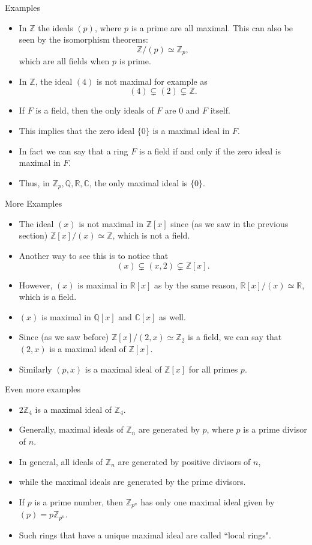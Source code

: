 \documentclass[ %
 10pt, xcolor={dvipsnames,svgnames,x11names,hyperref},
   hyperref={colorlinks=true,citecolor=green,linkcolor=DarkRed,urlcolor=ProcessBlue,anchorcolor=blue}
  ]{beamer}
\newenvironment{stepitemize}{\begin{itemize}[<+->]}{\end{itemize} }
\newcommand{\Z}{\mathbb{Z}}
\newcommand{\Q}{\mathbb{Q}}
\newcommand{\R}{\mathbb{R}}
\newcommand{\C}{\mathbb{C}}
\begin{document}
\begin{frame}{Examples}
\begin{stepitemize}
    \item In $\Z$ the ideals $(p)$, where $p$ is a prime are all maximal. This can also be seen by the isomorphism theorems:
    $$\Z/(p)\simeq \Z_p,$$
    which are all fields when $p$ is prime.
    \item In $\Z$, the ideal $(4)$ is not maximal for example as
    $$(4) \subsetneq (2) \subsetneq \Z.$$
    \item If $F$ is a field, then the only ideals of $F$ are $0$ and $F$ itself.
    \item This implies that the zero ideal $\{0\}$ is a maximal ideal in $F$.
    \item In fact we can say that a ring $F$ is a field if and only if the zero ideal is maximal in $F$.
    \item Thus, in $\Z_p, \Q, \R, \C$, the only maximal ideal is $\{0\}$.
\end{stepitemize}
\end{frame}
\begin{frame}{More Examples}
\begin{stepitemize}
    \item The ideal $(x)$ is not maximal in $\Z[x]$ since (as we saw in the previous section) $\Z[x]/(x)\simeq \Z$, which is not a field.
    \item Another way to see this is to notice that
    $$(x) \subsetneq (x,2) \subsetneq \Z[x].$$
    \item However, $(x)$ is maximal in $\R[x]$ as by the same reason, $\R[x]/(x)\simeq \R$, which is a field.
    \item $(x)$ is maximal in $\Q[x]$ and $\C[x]$ as well.
    \item Since (as we saw before) $\Z[x]/(2,x) \simeq \Z_2$ is a field, we can say that $(2,x)$ is a maximal ideal of $\Z[x]$.
    \item Similarly $(p,x)$ is a maximal ideal of $\Z[x]$ for all primes $p$.
\end{stepitemize}
\end{frame}

\begin{frame}{Even more examples}
\begin{stepitemize}
        \item $2\Z_4$ is a maximal ideal of $\Z_4$.
        \item Generally, maximal ideals of $\Z_n$ are generated by $p$, where $p$ is a prime divisor of $n$.
        \item In general, all ideals of $\Z_n$ are generated by positive divisors of $n$,
        \item while the maximal ideals are generated by the prime divisors.
    \item If $p$ is a prime number, then $\Z_{p^n}$ has only one maximal ideal given by $(p) = p\Z_{p^n}$.
    \item Such rings that have a unique maximal ideal are called ``local rings".
\end{stepitemize}
\end{frame}
\end{document}

